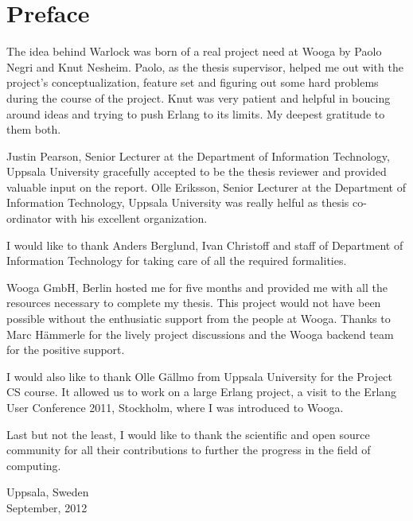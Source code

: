 \chapter{Preface}

The idea behind Warlock was born of a real project need at Wooga by Paolo Negri
and Knut Nesheim. Paolo, as the thesis supervisor, helped me out with the
project's conceptualization, feature set and figuring out some hard problems
during the course of the project. Knut was very patient and helpful in boucing
around ideas and trying to push Erlang to its limits. My deepest gratitude to 
them both.

Justin Pearson, Senior Lecturer at the Department of Information Technology,
Uppsala University gracefully accepted to be the thesis reviewer and provided
valuable input on the report. Olle Eriksson, Senior Lecturer at the Department
of Information Technology, Uppsala University was really helful as thesis
co-ordinator with his excellent organization.

I would like to thank Anders Berglund, Ivan Christoff and staff of Department
of Information Technology for taking care of all the required formalities.

Wooga GmbH, Berlin hosted me for five months and provided me with all the 
resources necessary to complete my thesis. This project would not have 
been possible without the enthusiatic support from the people 
at Wooga. Thanks to Marc Hämmerle for the lively project discussions and 
the Wooga backend team for the positive support.

I would also like to thank Olle Gällmo from Uppsala University for the
Project CS course. It allowed us to work on a large Erlang project,
a visit to the Erlang User Conference 2011, Stockholm, where I was
introduced to Wooga.

Last but not the least, I would like to thank the scientific and open
source community for all their contributions to further the progress in the
field of computing.\\


\raggedright{Uppsala, Sweden \\
September, 2012}

